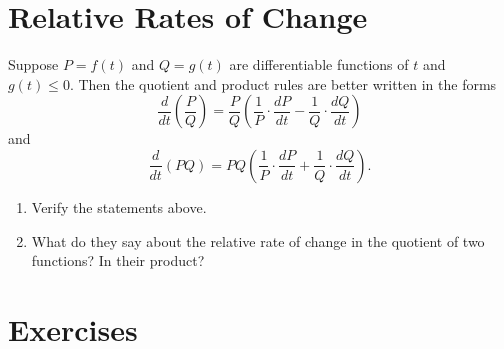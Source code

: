 \documentclass{ximera}
\begin{document}
\section{Relative Rates of Change}

Suppose $P=f(t)$ and $Q=g(t)$ are differentiable functions of $t$ and $g(t)\leq 0$. Then the quotient and product rules are better written in the forms
\[
   \frac{d}{dt} \left( \frac{P}{Q} \right) =  \frac{P}{Q} \left(   \frac{1}{P}\cdot \frac {dP}{dt} -  \frac{1}{Q}\cdot \frac {dQ}{dt}      \right)
\]
and
\[
   \frac{d}{dt} \left( PQ \right) =  PQ \left(   \frac{1}{P}\cdot \frac {dP}{dt} + \frac{1}{Q}\cdot \frac {dQ}{dt}      \right) .
\]

\begin{question} \label{Qgbhere}
\begin{enumerate}
\item Verify the statements above.

\item What do they say about the relative rate of change in the quotient of two functions? In their product?
\end{enumerate}
\end{question}

\section{Exercises}
\end{document}
